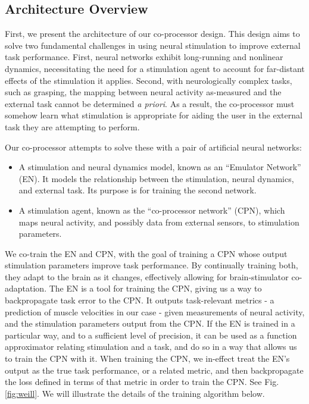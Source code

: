 \documentclass[12pt]{iopart}
\begin{document}
\subsection{Architecture Overview}
First, we present the architecture of our co-processor design. This design aims to solve two
fundamental challenges in using neural stimulation to improve external task performance.
First, neural networks exhibit long-running and nonlinear dynamics, necessitating
the need for a stimulation agent to account for far-distant effects of the stimulation it
applies. Second, with neurologically complex tasks, such as grasping, the mapping between
neural activity as-measured and the external task cannot be determined \textit{a priori}.
As a result, the co-processor must somehow learn what stimulation is appropriate for
aiding the user in the external task they are attempting to perform.

Our co-processor attempts to solve these with a pair of artificial neural networks:
\begin{itemize}
	\item A stimulation and neural dynamics model, known as an ``Emulator Network'' (EN). It models the relationship
	      between the stimulation, neural dynamics, and external task. Its purpose is for training the second network.
	\item A stimulation agent, known as the ``co-processor network'' (CPN), which maps neural activity, and possibly
	      data from external sensors, to stimulation parameters.
\end{itemize}

We co-train the EN and CPN, with the goal of training a CPN whose output stimulation parameters
improve task performance. By continually training both, they adapt to the brain as it changes,
effectively allowing for brain-stimulator co-adaptation. The EN is a tool for training the CPN,
giving us a way to backpropagate task error to the CPN. It outputs task-relevant
metrics - a prediction of muscle velocities in our case - given measurements of neural
activity, and the stimulation parameters output from the CPN. If the EN is trained in a
particular way, and to a sufficient level of precision, it can be used as a function
approximator relating stimulation and a task, and do so in a way that allows us to train
the CPN with it. When training the CPN, we in-effect treat the EN's output as the true
task performance, or a related metric, and then backpropagate the loss defined in terms
of that metric in order to train the CPN. See Fig. \ref{fig:weill}. We will illustrate the details
of the training algorithm below.
\end{document}

